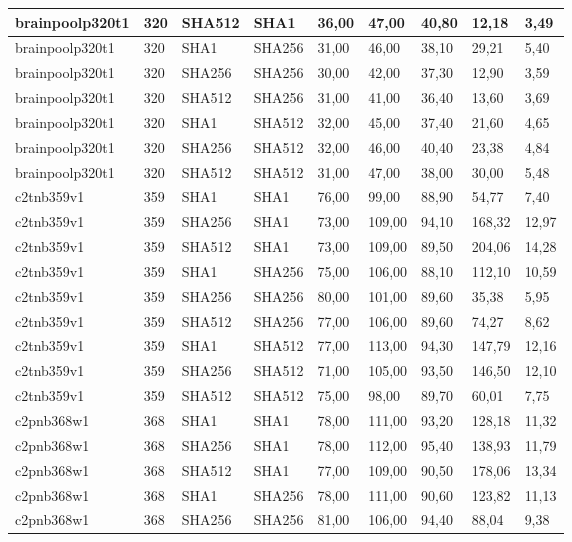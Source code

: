 \begin{longtable}{| l | l | l | l | l |l |l |l |l |}
brainpoolp320t1 & 320 & SHA512 & SHA1 & 36,00 & 47,00 & 40,80 & 12,18 & 3,49 \\ \hline 
brainpoolp320t1 & 320 & SHA1 & SHA256 & 31,00 & 46,00 & 38,10 & 29,21 & 5,40 \\ \hline 
brainpoolp320t1 & 320 & SHA256 & SHA256 & 30,00 & 42,00 & 37,30 & 12,90 & 3,59 \\ \hline 
brainpoolp320t1 & 320 & SHA512 & SHA256 & 31,00 & 41,00 & 36,40 & 13,60 & 3,69 \\ \hline 
brainpoolp320t1 & 320 & SHA1 & SHA512 & 32,00 & 45,00 & 37,40 & 21,60 & 4,65 \\ \hline 
brainpoolp320t1 & 320 & SHA256 & SHA512 & 32,00 & 46,00 & 40,40 & 23,38 & 4,84 \\ \hline 
brainpoolp320t1 & 320 & SHA512 & SHA512 & 31,00 & 47,00 & 38,00 & 30,00 & 5,48 \\ \hline 
c2tnb359v1 & 359 & SHA1 & SHA1 & 76,00 & 99,00 & 88,90 & 54,77 & 7,40 \\ \hline 
c2tnb359v1 & 359 & SHA256 & SHA1 & 73,00 & 109,00 & 94,10 & 168,32 & 12,97 \\ \hline 
c2tnb359v1 & 359 & SHA512 & SHA1 & 73,00 & 109,00 & 89,50 & 204,06 & 14,28 \\ \hline 
c2tnb359v1 & 359 & SHA1 & SHA256 & 75,00 & 106,00 & 88,10 & 112,10 & 10,59 \\ \hline 
c2tnb359v1 & 359 & SHA256 & SHA256 & 80,00 & 101,00 & 89,60 & 35,38 & 5,95 \\ \hline 
c2tnb359v1 & 359 & SHA512 & SHA256 & 77,00 & 106,00 & 89,60 & 74,27 & 8,62 \\ \hline 
c2tnb359v1 & 359 & SHA1 & SHA512 & 77,00 & 113,00 & 94,30 & 147,79 & 12,16 \\ \hline 
c2tnb359v1 & 359 & SHA256 & SHA512 & 71,00 & 105,00 & 93,50 & 146,50 & 12,10 \\ \hline 
c2tnb359v1 & 359 & SHA512 & SHA512 & 75,00 & 98,00 & 89,70 & 60,01 & 7,75 \\ \hline 
c2pnb368w1 & 368 & SHA1 & SHA1 & 78,00 & 111,00 & 93,20 & 128,18 & 11,32 \\ \hline 
c2pnb368w1 & 368 & SHA256 & SHA1 & 78,00 & 112,00 & 95,40 & 138,93 & 11,79 \\ \hline 
c2pnb368w1 & 368 & SHA512 & SHA1 & 77,00 & 109,00 & 90,50 & 178,06 & 13,34 \\ \hline 
c2pnb368w1 & 368 & SHA1 & SHA256 & 78,00 & 111,00 & 90,60 & 123,82 & 11,13 \\ \hline 
c2pnb368w1 & 368 & SHA256 & SHA256 & 81,00 & 106,00 & 94,40 & 88,04 & 9,38 \\ \hline 

\end{longtable}
